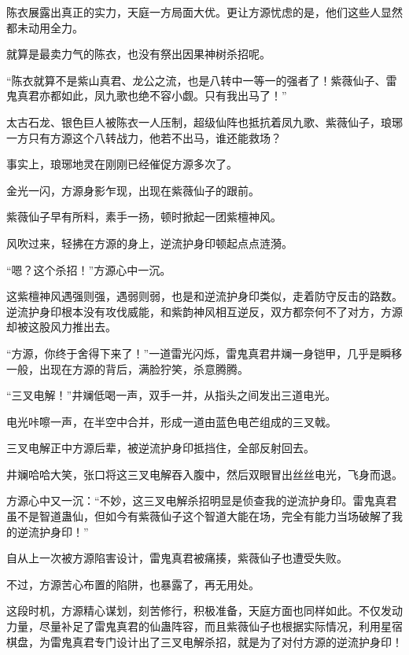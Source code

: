 
\begin{this_body}



陈衣展露出真正的实力，天庭一方局面大优。更让方源忧虑的是，他们这些人显然都未动用全力。

就算是最卖力气的陈衣，也没有祭出因果神树杀招呢。

“陈衣就算不是紫山真君、龙公之流，也是八转中一等一的强者了！紫薇仙子、雷鬼真君亦都如此，凤九歌也绝不容小觑。只有我出马了！”

太古石龙、银色巨人被陈衣一人压制，超级仙阵也抵抗着凤九歌、紫薇仙子，琅琊一方只有方源这个八转战力，他若不出马，谁还能救场？

事实上，琅琊地灵在刚刚已经催促方源多次了。

金光一闪，方源身影乍现，出现在紫薇仙子的跟前。

紫薇仙子早有所料，素手一扬，顿时掀起一团紫檀神风。

风吹过来，轻拂在方源的身上，逆流护身印顿起点点涟漪。

“嗯？这个杀招！”方源心中一沉。

这紫檀神风遇强则强，遇弱则弱，也是和逆流护身印类似，走着防守反击的路数。逆流护身印根本没有攻伐威能，和紫韵神风相互逆反，双方都奈何不了对方，方源却被这股风力推出去。

“方源，你终于舍得下来了！”一道雷光闪烁，雷鬼真君井斓一身铠甲，几乎是瞬移一般，出现在方源的背后，满脸狞笑，杀意腾腾。

“三叉电解！”井斓低喝一声，双手一并，从指头之间发出三道电光。

电光咔嚓一声，在半空中合并，形成一道由蓝色电芒组成的三叉戟。

三叉电解正中方源后辈，被逆流护身印抵挡住，全部反射回去。

井斓哈哈大笑，张口将这三叉电解吞入腹中，然后双眼冒出丝丝电光，飞身而退。

方源心中又一沉：“不妙，这三叉电解杀招明显是侦查我的逆流护身印。雷鬼真君虽不是智道蛊仙，但如今有紫薇仙子这个智道大能在场，完全有能力当场破解了我的逆流护身印！”

自从上一次被方源陷害设计，雷鬼真君被痛揍，紫薇仙子也遭受失败。

不过，方源苦心布置的陷阱，也暴露了，再无用处。

这段时机，方源精心谋划，刻苦修行，积极准备，天庭方面也同样如此。不仅发动力量，尽量补足了雷鬼真君的仙蛊阵容，而且紫薇仙子也根据实际情况，利用星宿棋盘，为雷鬼真君专门设计出了三叉电解杀招，就是为了对付方源的逆流护身印！


\end{this_body}
